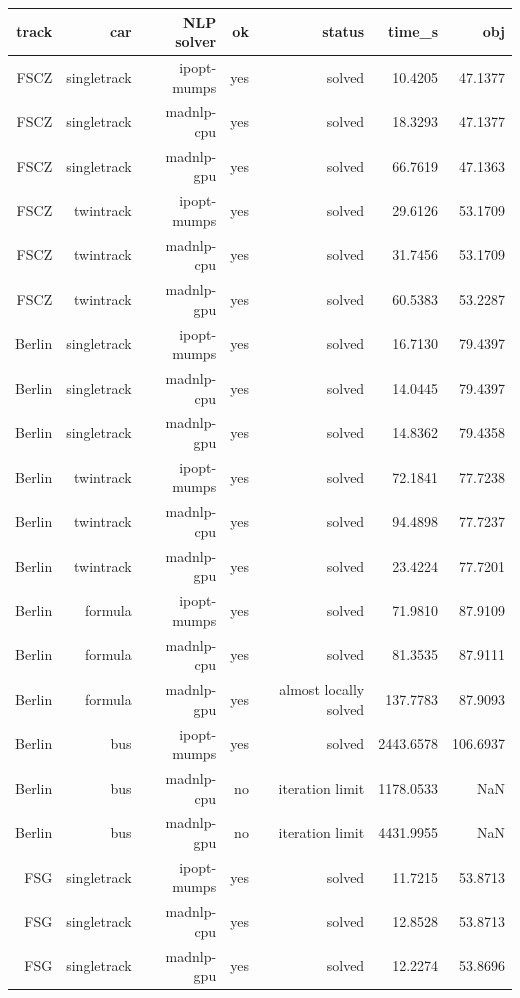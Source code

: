 {\footnotesize
\begin{longtable}{|r|r|r|r|r|r|r|}
  \hline
  \textbf{track} & \textbf{car} & \textbf{NLP solver} & \textbf{ok} & \textbf{status} & \textbf{time\_s} & \textbf{obj} \\
  \hline
  FSCZ & singletrack & ipopt-mumps & yes & solved & 10.4205 & 47.1377 \\
  FSCZ & singletrack & madnlp-cpu & yes & solved & 18.3293 & 47.1377 \\
  FSCZ & singletrack & madnlp-gpu & yes & solved & 66.7619 & 47.1363 \\
  FSCZ & twintrack & ipopt-mumps & yes & solved & 29.6126 & 53.1709 \\
  FSCZ & twintrack & madnlp-cpu & yes & solved & 31.7456 & 53.1709 \\
  FSCZ & twintrack & madnlp-gpu & yes & solved & 60.5383 & 53.2287 \\
  Berlin & singletrack & ipopt-mumps & yes & solved & 16.7130 & 79.4397 \\
  Berlin & singletrack & madnlp-cpu & yes & solved & 14.0445 & 79.4397 \\
  Berlin & singletrack & madnlp-gpu & yes & solved & 14.8362 & 79.4358 \\
  Berlin & twintrack & ipopt-mumps & yes & solved & 72.1841 & 77.7238 \\
  Berlin & twintrack & madnlp-cpu & yes & solved & 94.4898 & 77.7237 \\
  Berlin & twintrack & madnlp-gpu & yes & solved & 23.4224 & 77.7201 \\
  Berlin & formula & ipopt-mumps & yes & solved & 71.9810 & 87.9109 \\
  Berlin & formula & madnlp-cpu & yes & solved & 81.3535 & 87.9111 \\
  Berlin & formula & madnlp-gpu & yes & almost locally solved & 137.7783 & 87.9093 \\
  Berlin & bus & ipopt-mumps & yes & solved & 2443.6578 & 106.6937 \\
  Berlin & bus & madnlp-cpu & no & iteration limit & 1178.0533 & NaN \\
  Berlin & bus & madnlp-gpu & no & iteration limit & 4431.9955 & NaN \\
  FSG & singletrack & ipopt-mumps & yes & solved & 11.7215 & 53.8713 \\
  FSG & singletrack & madnlp-cpu & yes & solved & 12.8528 & 53.8713 \\
  FSG & singletrack & madnlp-gpu & yes & solved & 12.2274 & 53.8696 \\

\end{longtable}}
